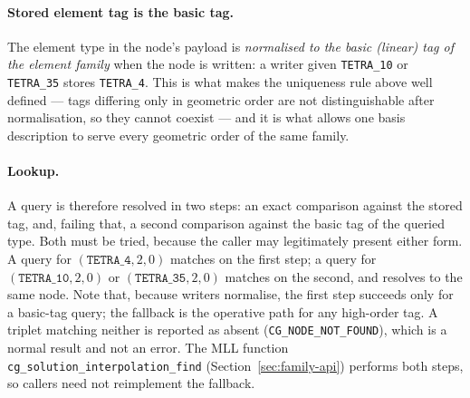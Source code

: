 \documentclass[11pt,letterpaper]{article}
\begin{document}
\paragraph{Stored element tag is the basic tag.}
The element type in the node's payload is \emph{normalised to the basic (linear) tag of
the element family} when the node is written: a writer given \texttt{TETRA\_10} or
\texttt{TETRA\_35} stores \texttt{TETRA\_4}.  This is what makes the uniqueness rule
above well defined --- tags differing only in geometric order are not distinguishable
after normalisation, so they cannot coexist --- and it is what allows one basis
description to serve every geometric order of the same family.

\paragraph{Lookup.}
A query is therefore resolved in two steps: an exact comparison against the stored
tag, and, failing that, a second comparison against the basic tag of the queried type.
Both must be tried, because the caller may legitimately present either form.  A query
for $(\texttt{TETRA\_4}, 2, 0)$ matches on the first step; a query for
$(\texttt{TETRA\_10}, 2, 0)$ or $(\texttt{TETRA\_35}, 2, 0)$ matches on the second, and
resolves to the same node.  Note that, because writers normalise, the first step
succeeds only for a basic-tag query; the fallback is the operative path for any
high-order tag.  A triplet matching neither is reported as absent (\texttt{CG\_NODE\_NOT\_FOUND}),
which is a normal result and not an error.  The MLL function
\texttt{cg\_solution\_interpolation\_find} (Section~\ref{sec:family-api}) performs both
steps, so callers need not reimplement the fallback.
\end{document}
